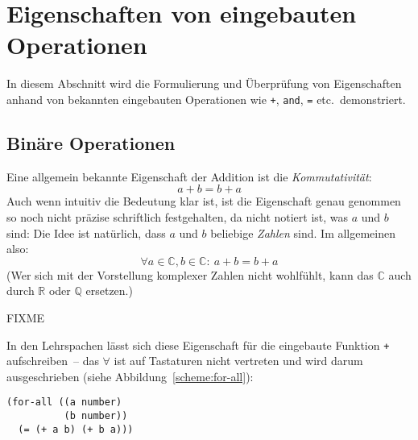 \section{Eigenschaften von eingebauten Operationen}

In diesem Abschnitt wird die Formulierung und Überprüfung von
Eigenschaften anhand von bekannten eingebauten Operationen wie
\lstinline{+}, \lstinline{and}, \lstinline{=} etc.\ demonstriert.

\subsection{Binäre Operationen}
\label{sec:eigenschaften-binaere-operationen}

Eine allgemein bekannte Eigenschaft der Addition ist die
\textit{Kommutativität}:
%
\begin{displaymath}
a + b = b + a
\end{displaymath}
%
Auch wenn intuitiv die Bedeutung klar ist, ist  die Eigenschaft genau
genommen so noch nicht präzise schriftlich festgehalten, da nicht
notiert ist, was $a$ und $b$ sind: Die Idee ist natürlich,
dass $a$ und $b$ beliebige \emph{Zahlen} sind.  Im allgemeinen also:
%
\begin{displaymath}
\forall a \in \mathbb{C}, b \in \mathbb{C}:\ a + b = b + a 
\end{displaymath}
%
(Wer sich mit der Vorstellung komplexer Zahlen nicht wohlfühlt, kann
das $\mathbb{C}$ auch durch $\mathbb{R}$ oder $\mathbb{Q}$ ersetzen.)

FIXME

In den Lehrspachen lässt sich diese Eigenschaft für die eingebaute Funktion
\lstinline{+} aufschreiben~-- das $\forall$ ist auf
Tastaturen nicht vertreten und wird darum ausgeschrieben (siehe
Abbildung~\ref{scheme:for-all}):
%
\begin{lstlisting}
(for-all ((a number)
          (b number))
  (= (+ a b) (+ b a)))
\end{lstlisting}
%

